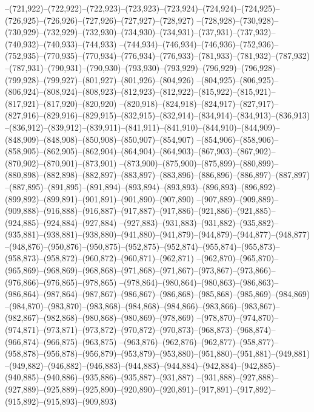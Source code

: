 --(721,922)--(722,922)--(722,923)--(723,923)--(723,924)--(724,924)--(724,925)--(726,925)--(726,926)--(727,926)--(727,927)--(728,927)
--(728,928)--(730,928)--(730,929)--(732,929)--(732,930)--(734,930)--(734,931)--(737,931)--(737,932)--(740,932)--(740,933)--(744,933)
--(744,934)--(746,934)--(746,936)--(752,936)--(752,935)--(770,935)--(770,934)--(776,934)--(776,933)--(781,933)--(781,932)--(787,932)
--(787,931)--(790,931)--(790,930)--(793,930)--(793,929)--(796,929)--(796,928)--(799,928)--(799,927)--(801,927)--(801,926)--(804,926)
--(804,925)--(806,925)--(806,924)--(808,924)--(808,923)--(812,923)--(812,922)--(815,922)--(815,921)--(817,921)--(817,920)--(820,920)
--(820,918)--(824,918)--(824,917)--(827,917)--(827,916)--(829,916)--(829,915)--(832,915)--(832,914)--(834,914)--(834,913)--(836,913)
--(836,912)--(839,912)--(839,911)--(841,911)--(841,910)--(844,910)--(844,909)--(848,909)--(848,908)--(850,908)--(850,907)--(854,907)
--(854,906)--(858,906)--(858,905)--(862,905)--(862,904)--(864,904)--(864,903)--(867,903)--(867,902)--(870,902)--(870,901)--(873,901)
--(873,900)--(875,900)--(875,899)--(880,899)--(880,898)--(882,898)--(882,897)--(883,897)--(883,896)--(886,896)--(886,897)--(887,897)
--(887,895)--(891,895)--(891,894)--(893,894)--(893,893)--(896,893)--(896,892)--(899,892)--(899,891)--(901,891)--(901,890)--(907,890)
--(907,889)--(909,889)--(909,888)--(916,888)--(916,887)--(917,887)--(917,886)--(921,886)--(921,885)--(924,885)--(924,884)--(927,884)
--(927,883)--(931,883)--(931,882)--(935,882)--(935,881)--(938,881)--(938,880)--(941,880)--(941,879)--(944,879)--(944,877)--(948,877)
--(948,876)--(950,876)--(950,875)--(952,875)--(952,874)--(955,874)--(955,873)--(958,873)--(958,872)--(960,872)--(960,871)--(962,871)
--(962,870)--(965,870)--(965,869)--(968,869)--(968,868)--(971,868)--(971,867)--(973,867)--(973,866)--(976,866)--(976,865)--(978,865)
--(978,864)--(980,864)--(980,863)--(986,863)--(986,864)--(987,864)--(987,867)--(986,867)--(986,868)--(985,868)--(985,869)--(984,869)
--(984,870)--(983,870)--(983,868)--(984,868)--(984,866)--(983,866)--(983,867)--(982,867)--(982,868)--(980,868)--(980,869)--(978,869)
--(978,870)--(974,870)--(974,871)--(973,871)--(973,872)--(970,872)--(970,873)--(968,873)--(968,874)--(966,874)--(966,875)--(963,875)
--(963,876)--(962,876)--(962,877)--(958,877)--(958,878)--(956,878)--(956,879)--(953,879)--(953,880)--(951,880)--(951,881)--(949,881)
--(949,882)--(946,882)--(946,883)--(944,883)--(944,884)--(942,884)--(942,885)--(940,885)--(940,886)--(935,886)--(935,887)--(931,887)
--(931,888)--(927,888)--(927,889)--(925,889)--(925,890)--(920,890)--(920,891)--(917,891)--(917,892)--(915,892)--(915,893)--(909,893)
